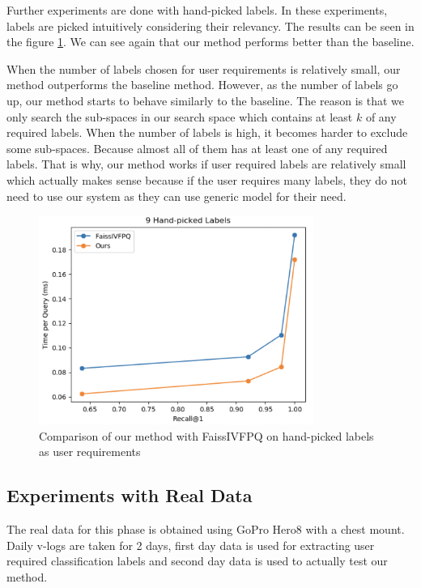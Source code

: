 Further experiments are done with hand-picked labels. 
In these experiments, labels are picked intuitively considering their relevancy. 
The results can be seen in the figure \ref{fig:handpickedexp}. 
We can see again that our method performs better than the baseline.

When the number of labels chosen for user requirements is relatively small, our method outperforms the baseline method.
However, as the number of labels go up, our method starts to behave similarly to the baseline.
The reason is that we only search the sub-spaces in our search space which contains at least $k$ of any required labels. 
When the number of labels is high, it becomes harder to exclude some sub-spaces. Because almost all of them has at least one of any required labels. 
That is why, our method works if user required labels are relatively small which actually makes sense because if the user requires many labels, they do not need to use our system as they can use generic model for their need.


\begin{figure}
    \centering
    \includegraphics[width=0.8\textwidth]{thesis/images/9_handpicked.png}
    \caption{Comparison of our method with FaissIVFPQ on hand-picked labels as user requirements}
    \label{fig:handpickedexp}
\end{figure}

\subsection*{Experiments with Real Data}

The real data for this phase is obtained using GoPro Hero8 with a chest mount. 
Daily v-logs are taken for 2 days, first day data is used for extracting user required classification labels and second day data is used to actually test our method.

